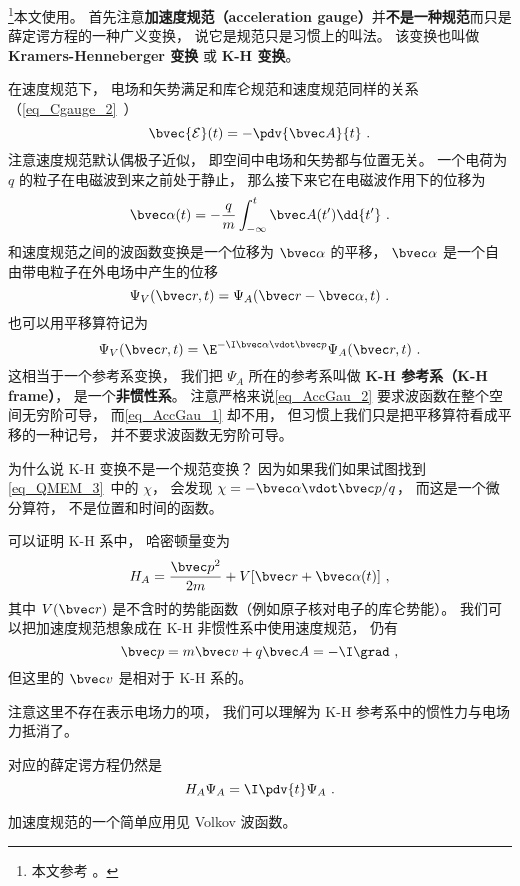 

\footnote{本文参考 \cite{Bransden}。}本文使用。 首先注意\textbf{加速度规范（acceleration gauge）}并\textbf{不是一种规范}而只是薛定谔方程的一种广义变换， 说它是规范只是习惯上的叫法。 该变换也叫做 \textbf{Kramers-Henneberger 变换} 或 \textbf{K-H 变换}。

\enref

在速度规范下， 电场和矢势满足和库仑规范和速度规范同样的关系（\autoref{eq_Cgauge_2}~）
\begin{equation}\label{eq_AccGau_5}
\bvec {\mathcal{E}}(t) = -\pdv{\bvec A}{t}~.
\end{equation}
注意速度规范默认偶极子近似， 即空间中电场和矢势都与位置无关。 一个电荷为 $q$ 的粒子在电磁波到来之前处于静止， 那么接下来它在电磁波作用下的位移为
\begin{equation}\label{eq_AccGau_3}
\bvec \alpha(t) = -\frac{q}{m}\int_{-\infty}^t \bvec A(t') \dd{t'}~.
\end{equation}
和速度规范之间的波函数变换是一个位移为 $\bvec \alpha$ 的平移， $\bvec \alpha$ 是一个自由带电粒子在外电场中产生的位移
\begin{equation}\label{eq_AccGau_1}
\Psi_V(\bvec r, t) = \Psi_A(\bvec r - \bvec \alpha, t)~.
\end{equation}
也可以用平移算符记为
\begin{equation}\label{eq_AccGau_2}
\Psi_V(\bvec r, t) = \E^{-\I \bvec \alpha \vdot \bvec p} \Psi_A(\bvec r, t)~.
\end{equation}
这相当于一个参考系变换， 我们把 $\Psi_A$ 所在的参考系叫做 \textbf{K-H 参考系（K-H frame）}， 是一个\textbf{非惯性系}。 注意严格来说\autoref{eq_AccGau_2} 要求波函数在整个空间无穷阶可导， 而\autoref{eq_AccGau_1} 却不用， 但习惯上我们只是把平移算符看成平移的一种记号， 并不要求波函数无穷阶可导。

为什么说 K-H 变换不是一个规范变换？ 因为如果我们如果试图找到\autoref{eq_QMEM_3}~中的 $\chi$， 会发现 $\chi = -\bvec \alpha \vdot \bvec p/q$， 而这是一个微分算符， 不是位置和时间的函数。

可以证明 K-H 系中， 哈密顿量变为
\begin{equation}
H_A = \frac{\bvec p^2}{2m} + V[\bvec r + \bvec \alpha(t)]~,
\end{equation}
其中 $V(\bvec r)$ 是不含时的势能函数（例如原子核对电子的库仑势能）。 我们可以把加速度规范想象成在 K-H 非惯性系中使用速度规范， 仍有
\begin{equation}
\bvec p = m\bvec v + q\bvec A = -\I \grad~,
\end{equation}
但这里的 $\bvec v$ 是相对于 K-H 系的。

注意这里不存在表示电场力的项， 我们可以理解为 K-H 参考系中的惯性力与电场力抵消了。

对应的薛定谔方程仍然是
\begin{equation}\label{eq_AccGau_4}
H_A \Psi_A = \I \pdv{t} \Psi_A~.
\end{equation}


加速度规范的一个简单应用见 Volkov 波函数。
